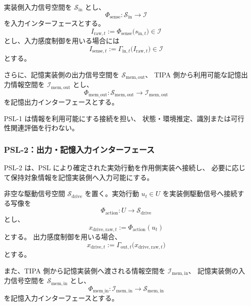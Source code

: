 \begin{definition}
\label{def:psl1}
実装側入力信号空間を $\mathcal S_{\mathrm{in}}$ とし、
\[
  \Phi_{\mathrm{sense}}:
  \mathcal S_{\mathrm{in}}\to\mathcal I
\]
を入力インターフェースとする。
\[
  I_{\mathrm{raw},t}
  :=
  \Phi_{\mathrm{sense}}\bigl(s_{\mathrm{in},t}\bigr)
  \in\mathcal I
\]
とし、入力感度制御を用いる場合には
\[
  I_{\mathrm{sense},t}
  :=
  \Gamma_{\mathrm{in},t}\bigl(I_{\mathrm{raw},t}\bigr)
  \in\mathcal I
\]
とする。

さらに、記憶実装側の出力信号空間を
$\mathcal S_{\mathrm{mem},\mathrm{out}}$、
TIPA 側から利用可能な記憶出力情報空間を
$\mathcal I_{\mathrm{mem},\mathrm{out}}$ とし、
\[
  \Phi_{\mathrm{mem\_out}}:
  \mathcal S_{\mathrm{mem},\mathrm{out}}
  \to
  \mathcal I_{\mathrm{mem},\mathrm{out}}
\]
を記憶出力インターフェースとする。
\end{definition}

\begin{remark}
\label{rem:psl1_m1}
PSL-1 は情報を利用可能にする接続を担い、
状態・環境推定、識別または可行性関連評価を行わない。
\end{remark}

\subsubsection{PSL-2：出力・記憶入力インターフェース}
\label{subsubsec:psl2}

PSL-2 は、PSL により確定された実効行動を作用側実装へ接続し、
必要に応じて保持対象情報を記憶実装側へ入力可能にする。

\begin{definition}
\label{def:psl2}
非空な駆動信号空間 $\mathcal S_{\mathrm{drive}}$ を置く。実効行動 $u_t\in U$ を実装側駆動信号へ接続する写像を
\[
  \Phi_{\mathrm{action}}:U\to \mathcal S_{\mathrm{drive}}
\]
とし、
\[
  x_{\mathrm{drive},\mathrm{raw},t}
  :=
  \Phi_{\mathrm{action}}(u_t)
\]
とする。
出力感度制御を用いる場合、
\[
  x_{\mathrm{drive},t}
  :=
  \Gamma_{\mathrm{out},t}
  \bigl(x_{\mathrm{drive},\mathrm{raw},t}\bigr)
\]
とする。

また、TIPA 側から記憶実装側へ渡される情報空間を
$\mathcal I_{\mathrm{mem},\mathrm{in}}$、
記憶実装側の入力信号空間を
$\mathcal S_{\mathrm{mem},\mathrm{in}}$ とし、
\[
  \Phi_{\mathrm{mem\_in}}:
  \mathcal I_{\mathrm{mem},\mathrm{in}}
  \to
  \mathcal S_{\mathrm{mem},\mathrm{in}}
\]
を記憶入力インターフェースとする。
\end{definition}

